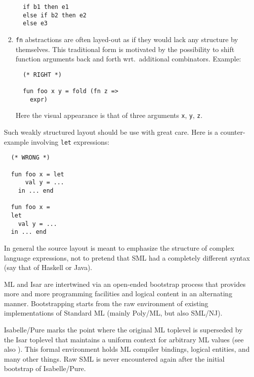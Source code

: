 \begin{isabellebody}
\begin{isamarkuptext}
\begin{enumerate}
\begin{verbatim}
  if b1 then e1
  else if b2 then e2
  else e3
  \end{verbatim}

  \item \verb|fn| abstractions are often layed-out as if they
  would lack any structure by themselves.  This traditional form is
  motivated by the possibility to shift function arguments back and
  forth wrt.\ additional combinators.  Example:

  \begin{verbatim}
  (* RIGHT *)

  fun foo x y = fold (fn z =>
    expr)
  \end{verbatim}

  Here the visual appearance is that of three arguments \verb|x|,
  \verb|y|, \verb|z|.

  \end{enumerate}

  Such weakly structured layout should be use with great care.  Here
  is a counter-example involving \verb|let| expressions:

  \begin{verbatim}
  (* WRONG *)

  fun foo x = let
      val y = ...
    in ... end

  fun foo x =
  let
    val y = ...
  in ... end
  \end{verbatim}

  \medskip In general the source layout is meant to emphasize the
  structure of complex language expressions, not to pretend that SML
  had a completely different syntax (say that of Haskell or Java).%
\end{isamarkuptext}%
\isamarkuptrue%
%
\isamarkuptrue%
%
\begin{isamarkuptext}%
ML and Isar are intertwined via an open-ended bootstrap
  process that provides more and more programming facilities and
  logical content in an alternating manner.  Bootstrapping starts from
  the raw environment of existing implementations of Standard ML
  (mainly Poly/ML, but also SML/NJ).

  Isabelle/Pure marks the point where the original ML toplevel is
  superseded by the Isar toplevel that maintains a uniform context for
  arbitrary ML values (see also ).  This formal
  environment holds ML compiler bindings, logical entities, and many
  other things.  Raw SML is never encountered again after the initial
  bootstrap of Isabelle/Pure.


\end{isamarkuptext}
\end{isabellebody}

